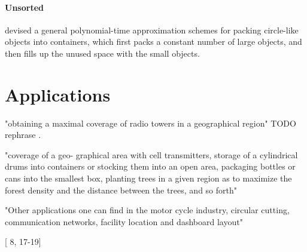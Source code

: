 \paragraph{Unsorted}

\cite{MPSSW2014polynomial} devised a general polynomial-time approximation schemes for packing circle-like objects into containers, which first packs a constant number of large objects, and then fills up the unused space with the small objects.

\section{Applications}

"obtaining a maximal coverage of radio towers in a geographical region" TODO rephrase \cite{SMCSCG2007new}.

"coverage of a geo-
graphical area with cell transmitters,
storage of a cylindrical drums into containers or
stocking them into an open area, packaging bottles or cans into the smallest box,
planting trees in a given region as to maximize the forest density and the distance
between the trees, and so forth"

"Other applications one can find in the motor
cycle industry, circular cutting, communication networks, facility location and
dashboard layout"

[ 8, 17-19]

